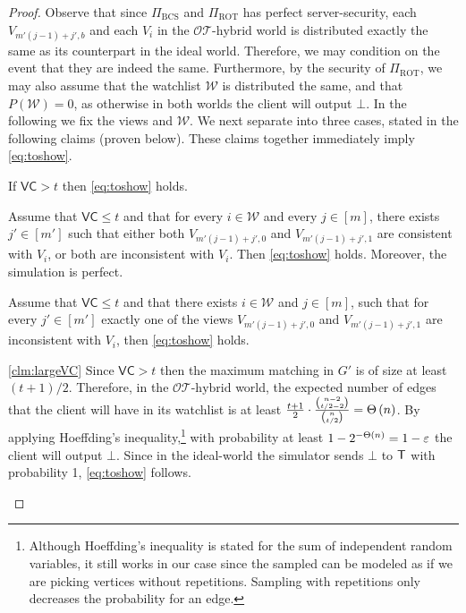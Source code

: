 \documentclass{llncs}
\newcommand{\OTfunc}{\mathcal{OT}}
\newcommand{\OThybrid}{\OTfunc\mbox{-}\text{hybrid}}
\newcommand{\ROT}{\operatorname{ROT}}
\newcommand{\stb}{\operatorname{BCS}}
\newcommand{\W}{\mathcal{W}}
\newcommand{\VC}{\mathsf{VC}}
\begin{document}
\begin{proof}
Observe that since $\Pi_{\stb}$ and $\Pi_{\ROT}$ has perfect server-security, each $V_{m'(j-1)+ j',b}$ and each $V_i$ in the $\OThybrid$ world is distributed exactly the same as its counterpart in the ideal world. Therefore, we may condition on the event that they are indeed the same. Furthermore, by the security of $\Pi_{\ROT}$, we may also assume that the watchlist $\W$ is distributed the same, and that $P(\W)=0$, as otherwise in both worlds the client will output $\bot$. In the following we fix the views and $\W$. We next separate into three cases, stated in the following claims (proven below). These claims together immediately imply \cref{eq:toshow}.

\begin{claim}\label{clm:largeVC}
If $\VC>t$ then \cref{eq:toshow} holds.
\end{claim}

\begin{claim}\label{clm:XNORconsistency}
Assume that $\VC\leq t$ and that for every $i\in\W$ and every $j\in[m]$, there exists $j'\in[m']$ such that either both $V_{m'(j-1)+j',0}$ and $V_{m'(j-1)+j',1}$ are consistent with $V_i$, or both are inconsistent with $V_i$. Then \cref{eq:toshow} holds. Moreover, the simulation is perfect.
\end{claim}

\begin{claim}\label{clm:XORconsistency}
Assume that $\VC\leq t$ and that there exists $i\in\W$ and $j\in[m]$, such that for every $j'\in[m']$ exactly one of the views $V_{m'(j-1)+j',0}$ and $V_{m'(j-1)+j',1}$ are inconsistent with $V_i$, then \cref{eq:toshow} holds. 
\end{claim}

\begin{proofof}{\cref{clm:largeVC}}
Since $\VC>t$ then the maximum matching in $G'$ is of size at least $(t+1)/2$. Therefore, in the $\OThybrid$ world, the expected number of edges that the client will have in its watchlist is at least $\frac{t+1}{2}\cdot\frac{\binom{n-2}{t/2-2}}{\binom{n}{t/2}}=\Theta\left ( n \right )$. By applying Hoeffding's inequality,\footnote{Although Hoeffding's inequality is stated for the sum of independent random variables, it still works in our case since the sampled can be modeled as if we are picking vertices without repetitions. Sampling with repetitions only decreases the probability for an edge.} with probability at least $1-2^{-\Theta\left ( n \right )}=1-\varepsilon$ the client will output $\bot$. Since in the ideal-world the simulator sends $\bot$ to $\mathsf{T}$ with probability 1, \cref{eq:toshow} follows.
\end{proofof}


\end{proof}
\end{document}
